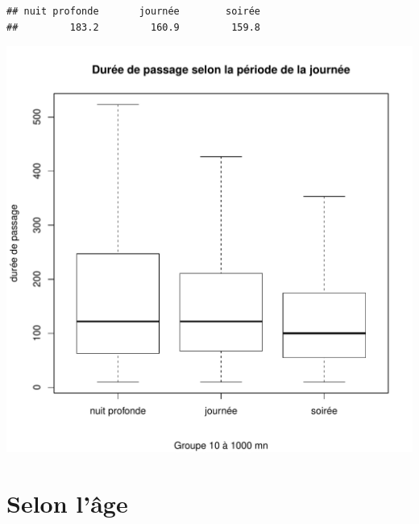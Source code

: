 \documentclass[12pt,english,french,twoside]{report}\usepackage[]{graphicx}\usepackage[]{color}
\makeatletter
\def\maxwidth{ %
  \ifdim\Gin@nat@width>\linewidth
    \linewidth
  \else
    \Gin@nat@width
  \fi
}
\newenvironment{kframe}{%
 \def\at@end@of@kframe{}%
 \ifinner\ifhmode%
  \def\at@end@of@kframe{\end{minipage}}%
  \begin{minipage}{\columnwidth}%
 \fi\fi%
 \def\FrameCommand##1{\hskip\@totalleftmargin \hskip-\fboxsep
 \colorbox{shadecolor}{##1}\hskip-\fboxsep
     \hskip-\linewidth \hskip-\@totalleftmargin \hskip\columnwidth}%
 \MakeFramed {\advance\hsize-\width
   \@totalleftmargin\z@ \linewidth\hsize
   \@setminipage}}%
 {\par\unskip\endMakeFramed%
 \at@end@of@kframe}
\newenvironment{knitrout}{}{} %
\makeatother
\begin{document}
\begin{knitrout}
\begin{kframe}\begin{verbatim}
## nuit profonde       journée        soirée 
##         183.2         160.9         159.8
\end{verbatim}
\end{kframe}
\includegraphics[width=\maxwidth]{figure/duree_heure3} 

\end{knitrout}


\section*{Selon l'âge}
\end{document}
